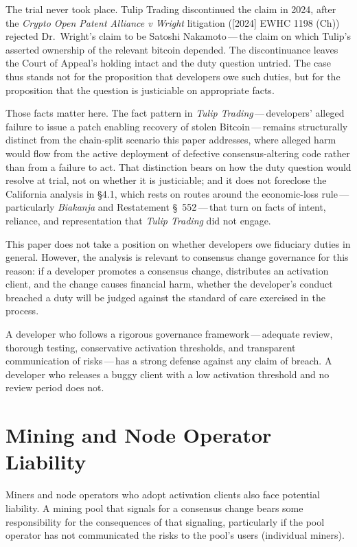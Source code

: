 \documentclass[11pt, twoside, openright]{book}
\newcommand{\sect}[1]{\S#1}
\begin{document}
The trial never took place. Tulip Trading discontinued the claim in 2024, after the \textit{Crypto Open Patent Alliance v Wright} litigation ([2024] EWHC 1198 (Ch)) rejected Dr.~Wright's claim to be Satoshi Nakamoto\,---\,the claim on which Tulip's asserted ownership of the relevant bitcoin depended. The discontinuance leaves the Court of Appeal's holding intact and the duty question untried. The case thus stands not for the proposition that developers owe such duties, but for the proposition that the question is justiciable on appropriate facts.

Those facts matter here. The fact pattern in \textit{Tulip Trading}\,---\,developers' alleged failure to issue a patch enabling recovery of stolen Bitcoin\,---\,remains structurally distinct from the chain-split scenario this paper addresses, where alleged harm would flow from the active deployment of defective consensus-altering code rather than from a failure to act. That distinction bears on how the duty question would resolve at trial, not on whether it is justiciable; and it does not foreclose the California analysis in \sect{4.1}, which rests on routes around the economic-loss rule\,---\,particularly \textit{Biakanja} and Restatement \S~552\,---\,that turn on facts of intent, reliance, and representation that \textit{Tulip Trading} did not engage.

This paper does not take a position on whether developers owe fiduciary duties in general. However, the analysis is relevant to consensus change governance for this reason: if a developer promotes a consensus change, distributes an activation client, and the change causes financial harm, whether the developer's conduct breached a duty will be judged against the standard of care exercised in the process.

A developer who follows a rigorous governance framework\,---\,adequate review, thorough testing, conservative activation thresholds, and transparent communication of risks\,---\,has a strong defense against any claim of breach. A developer who releases a buggy client with a low activation threshold and no review period does not.

\section{Mining and Node Operator Liability}

Miners and node operators who adopt activation clients also face potential liability. A mining pool that signals for a consensus change bears some responsibility for the consequences of that signaling, particularly if the pool operator has not communicated the risks to the pool's users (individual miners).
\end{document}
